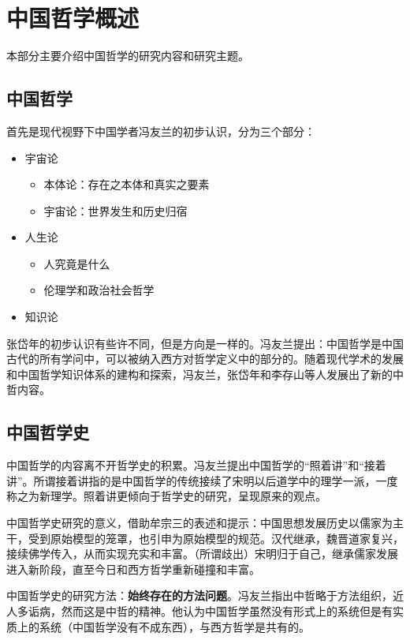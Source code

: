 \documentclass{ctexart}
\begin{document}
\section{中国哲学概述}

本部分主要介绍中国哲学的研究内容和研究主题。

\subsection{中国哲学}

首先是现代视野下中国学者冯友兰的初步认识，分为三个部分：

\begin{itemize}
    \item 宇宙论
    \begin{itemize}
        \item 本体论：存在之本体和真实之要素
        \item 宇宙论：世界发生和历史归宿
    \end{itemize}
    \item 人生论
    \begin{itemize}
        \item 人究竟是什么
        \item 伦理学和政治社会哲学
    \end{itemize}
    \item 知识论
\end{itemize}

张岱年的初步认识有些许不同，但是方向是一样的。冯友兰提出：中国哲学是中国古代的所有学问中，可以被纳入西方对哲学定义中的部分的。随着现代学术的发展和中国哲学知识体系的建构和探索，冯友兰，张岱年和李存山等人发展出了新的中哲内容。

\subsection{中国哲学史}

中国哲学的内容离不开哲学史的积累。冯友兰提出中国哲学的“照着讲”和“接着讲”。所谓接着讲指的是中国哲学的传统接续了宋明以后道学中的理学一派，一度称之为新理学。照着讲更倾向于哲学史的研究，呈现原来的观点。

中国哲学史研究的意义，借助牟宗三的表述和提示：中国思想发展历史以儒家为主干，受到原始模型的笼罩，也引申为原始模型的规范。汉代继承，魏晋道家复兴，接续佛学传入，从而实现充实和丰富。（所谓歧出）宋明归于自己，继承儒家发展进入新阶段，直至今日和西方哲学重新碰撞和丰富。

中国哲学史的研究方法：\textbf{始终存在的方法问题}。冯友兰指出中哲略于方法组织，近人多诟病，然而这是中哲的精神。他认为中国哲学虽然没有形式上的系统但是有实质上的系统（中国哲学没有不成东西），与西方哲学是共有的。
\end{document}

